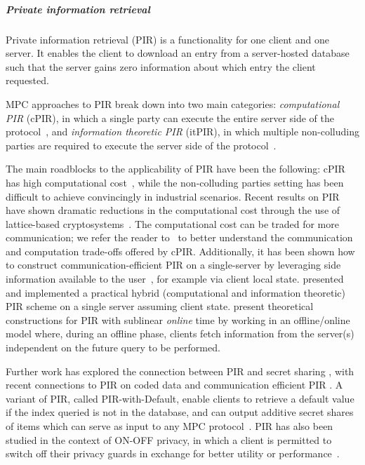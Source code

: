 \subparagraph{Private information retrieval}
Private information retrieval (PIR) is a functionality for one client and one server.  It enables the client to download an entry from a server-hosted database such that the server gains zero information about which entry the client requested.

MPC approaches to PIR break down into two main categories: \textit{computational PIR} (cPIR), in which a single party can execute the entire server side of the protocol~\cite{Kushilevitz97replicationis}, and \textit{information theoretic PIR} (itPIR), in which multiple non-colluding parties are required to execute the server side of the protocol~\cite{Chor98PIR}. 

The main roadblocks to the applicability of PIR have been the following: cPIR has high computational cost~\cite{sion2007computational}, while the non-colluding parties setting has been difficult to achieve convincingly in industrial scenarios. Recent results on PIR have shown dramatic reductions in the computational cost through the use of lattice-based cryptosystems~\cite{aguilar2007lattice,olumofin2011revisiting,aguilar2016xpir,DBLP:conf/sp/AngelCLS18,DBLP:conf/tcc/GentryH19}. The computational cost can be traded for more communication; we refer the reader to~\citet{DBLP:journals/iacr/AliLP0SSY19} to better understand the communication and computation trade-offs offered by cPIR. Additionally, it has been shown how to construct communication-efficient PIR on a single-server by leveraging side information available to the user~\cite{pirsideinfo}, for example via client local state. \citet{Patel18googlePIR} presented and implemented a practical hybrid (computational and information theoretic) PIR scheme on a single server assuming client state. \citet{DBLP:journals/iacr/Corrigan-GibbsK19a} present theoretical constructions for PIR with sublinear \emph{online} time by working in an offline/online model where, during an offline phase, clients fetch information from the server(s) independent on the future query to be performed.

Further work has explored the connection between PIR and secret sharing \cite {yekhaninpir}, with recent connections to PIR on coded data \cite{dolift} and communication efficient PIR \cite{staircasepir}. A variant of PIR, called PIR-with-Default, enable clients to retrieve a default value if the index queried is not in the database, and can output additive secret shares of items which can serve as input to any MPC protocol~\cite{DBLP:journals/iacr/LepointPRST20}. PIR has also been studied in the context of ON-OFF privacy, in which a client is permitted to switch off their privacy guards in exchange for better utility or performance~\cite{onoffisit,onoffitw}. 

